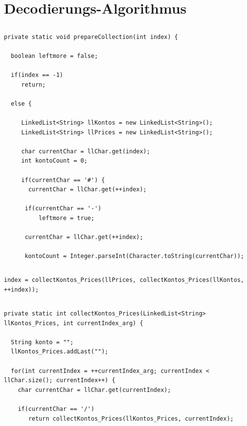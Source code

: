 \documentclass[12pt]{report}
\begin{document}
\section{Decodierungs-Algorithmus}

\subsection{}
\begin{lstlisting}
private static void prepareCollection(int index) {
	
  boolean leftmore = false;
	
  if(index == -1)
     return;
	
  else {
		
     LinkedList<String> llKontos = new LinkedList<String>();
     LinkedList<String> llPrices = new LinkedList<String>();
		
     char currentChar = llChar.get(index);
     int kontoCount = 0;
		
     if(currentChar == '#') {
	   currentChar = llChar.get(++index);
			
	  if(currentChar == '-')
	      leftmore = true;
			
	  currentChar = llChar.get(++index);
			
	  kontoCount = Integer.parseInt(Character.toString(currentChar));
\end{lstlisting}

\subsection{}
\begin{lstlisting}
index = collectKontos_Prices(llPrices, collectKontos_Prices(llKontos, ++index));
\end{lstlisting}

\subsection{}
\begin{lstlisting}
private static int collectKontos_Prices(LinkedList<String> llKontos_Prices, int currentIndex_arg) {
		
  String konto = "";
  llKontos_Prices.addLast("");
		
  for(int currentIndex = ++currentIndex_arg; currentIndex < llChar.size(); currentIndex++) {
	char currentChar = llChar.get(currentIndex);
			
	if(currentChar == '/')
	   return collectKontos_Prices(llKontos_Prices, currentIndex);
\end{lstlisting}
\end{document}
